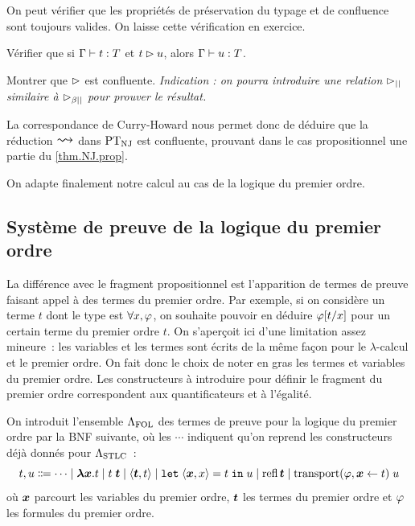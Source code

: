 On peut vérifier que les propriétés de préservation du typage et de confluence
sont toujours valides. On laisse cette vérification en exercice.

\begin{exercise}
  Vérifier que si $\Gamma\mathrel{\vdash} t : T$ et $t \rhd u$, alors
  $\Gamma\mathrel{\vdash} u : T$.
\end{exercise}

\begin{exercise}
  Montrer que $\rhd$ est confluente. \textit{Indication : on pourra
    introduire une relation $\rhd_{||}$ similaire à $\mathrel{\rhd_{\mathord{\beta}\mathord{||}}}$ pour
    prouver le résultat.}
\end{exercise}

La correspondance de Curry-Howard nous permet donc de déduire que la réduction
$\reecr{}$ dans $\operatorname{PT}_{\operatorname{NJ}}$ est confluente, prouvant dans le cas propositionnel
une partie du \cref{thm.NJ.prop}.

On adapte finalement notre calcul au cas de la logique du premier ordre.

\subsection{Système de preuve de la logique du premier ordre}

La différence avec le fragment propositionnel est l'apparition de termes de
preuve faisant appel à des termes du premier ordre. Par exemple, si on considère
un terme $t$ dont le type est $\forall x, \varphi$, on souhaite pouvoir en
déduire $\varphi[t/x]$ pour un certain terme du premier ordre $t$. On
s'aperçoit ici d'une limitation assez mineure~: les variables et les termes
sont écrits de la même façon pour le $\lambda$-calcul et le premier ordre. On
fait donc le choix de noter en gras les termes et variables du premier ordre.
Les constructeurs à introduire pour définir le fragment du premier ordre
correspondent aux quantificateurs et à l'égalité.

\begin{definition}
  On introduit l'ensemble $\Lambda_{\mathrm{FOL}}$ des termes de preuve pour la logique du
  premier ordre par la BNF suivante, où les $\cdots$ indiquent qu'on reprend
  les constructeurs déjà donnés pour $\Lambda_{\mathrm{STLC}}$~:
  \[t,u \inddefeq \cdots \mid \blam \bvarx. t\mid t\;\btermt
  \mid \langle \btermt, t\rangle\mid \letin{\bvarx} x t u\mid
  \refl\btermt\mid \transp(\varFF,\bvarx \leftarrow t)\;u\]
  où $\bm{x}$ parcourt les variables du premier ordre, $\bm{t}$ les
  termes du premier ordre et $\varphi$ les formules du premier ordre.
\end{definition}

